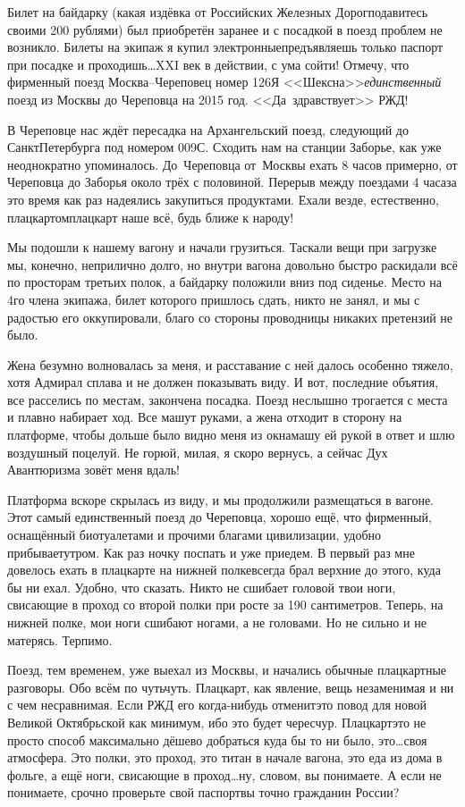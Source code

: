Билет на байдарку (какая издёвка от Российских Железных Дорог\mdash подавитесь своими 200 рублями) был приобретён заранее и с посадкой в поезд проблем не возникло. Билеты на экипаж я купил электронные\mdash предъявляешь только паспорт при посадке и проходишь\ldots XXI век в действии, с ума сойти! Отмечу, что фирменный поезд Москва\nobreakdash--Череповец номер 126Я <<Шексна>>\mdash \textit{единственный} поезд из Москвы до Череповца на 2015 год. <<Да~здравствует>> РЖД!
 
В Череповце нас ждёт пересадка на Архангельский поезд, следующий до Санкт\sdash Петербурга под номером 009С. Сходить нам на станции Заборье, как уже неоднократно упоминалось. До~Череповца от~Москвы ехать 8 часов примерно, от Череповца до Заборья около трёх с половиной. Перерыв между поездами 4 часа\mdash за это время как раз надеялись закупиться продуктами. Ехали везде, естественно, плацкартом\mdash плацкарт наше всё, будь ближе к народу! 

Мы подошли к нашему вагону и начали грузиться. Таскали вещи при загрузке мы, конечно, неприлично долго, но внутри вагона довольно быстро раскидали всё по просторам третьих полок, а байдарку положили вниз под сиденье. Место на 4\sdash го члена экипажа, билет которого пришлось сдать, никто не занял, и мы с радостью его оккупировали, благо со стороны проводницы никаких претензий не было.

Жена безумно волновалась за меня, и расставание с ней далось особенно тяжело, хотя Адмирал сплава и не должен показывать виду. И вот, последние объятия, все расселись по местам, закончена посадка. Поезд неслышно трогается с места и плавно набирает ход. Все машут руками, а жена отходит в сторону на платформе, чтобы дольше было видно меня из окна\mdash машу ей рукой в ответ и шлю воздушный поцелуй. Не горюй, милая, я скоро вернусь, а сейчас Дух Авантюризма зовёт меня вдаль!

Платформа вскоре скрылась из виду, и мы продолжили размещаться в вагоне. Этот самый единственный поезд до Череповца, хорошо ещё, что фирменный, оснащённый биотуалетами и прочими благами цивилизации, удобно прибывает\mdash утром. Как раз ночку поспать и уже приедем. В первый раз мне довелось ехать в плацкарте на нижней полке\mdash всегда брал верхние до этого, куда бы ни ехал. Удобно, что сказать. Никто не сшибает головой твои ноги, свисающие в проход со второй полки при росте за 190 сантиметров. Теперь, на нижней полке, мои ноги сшибают ногами, а не головами. Но не сильно и не матерясь. Терпимо. 

Поезд, тем временем, уже выехал из Москвы, и начались обычные плацкартные разговоры.  Обо всём по чуть\sdash чуть. Плацкарт, как явление, вещь незаменимая и ни с чем несравнимая. Если РЖД его когда-нибудь отменит\mdash это повод для новой Великой Октябрьской как минимум, ибо это будет чересчур. Плацкарт\mdash это не просто способ максимально дёшево добраться куда бы то ни было, это\ldots своя атмосфера. Это полки, это проход, это титан в начале вагона, это еда из дома в фольге, а ещё ноги, свисающие в проход\ldots ну, словом, вы понимаете. А если не понимаете, срочно проверьте свой паспорт\mdash вы точно гражданин России? 

